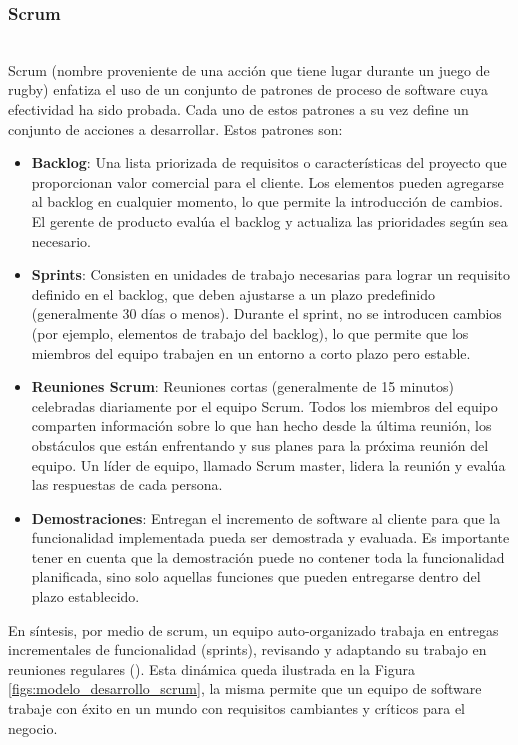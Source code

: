 \subsubsection{Scrum}\hfill\\ 
\indent
Scrum (nombre proveniente de una acción que tiene lugar durante un juego de rugby)  enfatiza el uso de un conjunto de patrones de proceso de software cuya efectividad ha sido probada. Cada uno de estos patrones a su vez define un conjunto de acciones a desarrollar. Estos patrones son:
\begin{itemize}[topsep=0pt]  
    \addtolength\itemsep{-4mm}
    \item \textbf{Backlog}: Una lista priorizada de requisitos o características del proyecto que proporcionan valor comercial para el cliente. Los elementos pueden agregarse al backlog en cualquier momento, lo que permite la introducción de cambios. El gerente de producto evalúa el backlog y actualiza las prioridades según sea necesario.
    \item \textbf{Sprints}: Consisten en unidades de trabajo necesarias para lograr un requisito definido en el backlog, que deben ajustarse a un plazo predefinido (generalmente 30 días o menos). Durante el sprint, no se introducen cambios (por ejemplo, elementos de trabajo del backlog), lo que permite que los miembros del equipo trabajen en un entorno a corto plazo pero estable.
    \item \textbf{Reuniones Scrum}: Reuniones cortas (generalmente de 15 minutos) celebradas diariamente por el equipo Scrum. Todos los miembros del equipo comparten información sobre lo que han hecho desde la última reunión, los obstáculos que están enfrentando y sus planes para la próxima reunión del equipo. Un líder de equipo, llamado Scrum master, lidera la reunión y evalúa las respuestas de cada persona. 
    \item \textbf{Demostraciones}: Entregan el incremento de software al cliente para que la funcionalidad implementada pueda ser demostrada y evaluada. Es importante tener en cuenta que la demostración puede no contener toda la funcionalidad planificada, sino solo aquellas funciones que pueden entregarse dentro del plazo establecido.
\end{itemize}
En síntesis, por medio de scrum, un equipo auto-organizado trabaja en entregas incrementales de funcionalidad (sprints), revisando y adaptando su trabajo en reuniones regulares (\cite{pressman2005software}). Esta dinámica queda ilustrada en la Figura \ref{figs:modelo_desarrollo_scrum}, la misma permite que un equipo de software trabaje con éxito en un mundo con requisitos cambiantes y críticos para el negocio.
